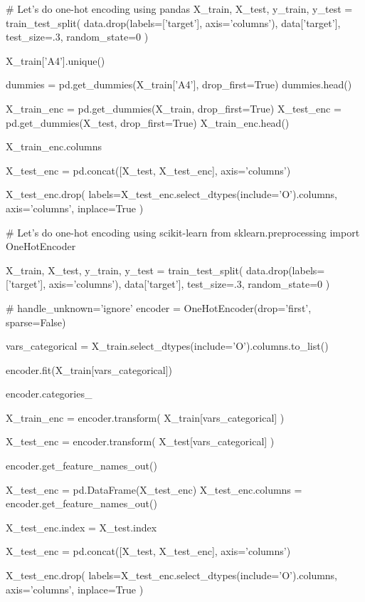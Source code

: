 \begin{pyc}
# Let’s do one-hot encoding using pandas
X_train, X_test, y_train, y_test = train_test_split(
    data.drop(labels=['target'], axis='columns'), data['target'],
    test_size=.3,
    random_state=0
)

X_train['A4'].unique()

dummies = pd.get_dummies(X_train['A4'], drop_first=True)
dummies.head()

X_train_enc = pd.get_dummies(X_train, drop_first=True)
X_test_enc = pd.get_dummies(X_test, drop_first=True)
X_train_enc.head()

X_train_enc.columns

X_test_enc = pd.concat([X_test, X_test_enc], axis='columns')

X_test_enc.drop(
    labels=X_test_enc.select_dtypes(include='O').columns,
    axis='columns',
    inplace=True
)
\end{pyc}

\begin{pyc}
# Let’s do one-hot encoding using scikit-learn
from sklearn.preprocessing import OneHotEncoder

X_train, X_test, y_train, y_test = train_test_split(
    data.drop(labels=['target'], axis='columns'), data['target'],
    test_size=.3,
    random_state=0
)

# handle_unknown='ignore'
encoder = OneHotEncoder(drop='first', sparse=False)

vars_categorical = X_train.select_dtypes(include='O').columns.to_list()

encoder.fit(X_train[vars_categorical])

encoder.categories_

X_train_enc = encoder.transform(
    X_train[vars_categorical]
)

X_test_enc = encoder.transform(
    X_test[vars_categorical]
)

encoder.get_feature_names_out()

X_test_enc = pd.DataFrame(X_test_enc)
X_test_enc.columns = encoder.get_feature_names_out()

X_test_enc.index = X_test.index

X_test_enc = pd.concat([X_test, X_test_enc], axis='columns')

X_test_enc.drop(
    labels=X_test_enc.select_dtypes(include='O').columns,
    axis='columns',
    inplace=True
)
\end{pyc}


